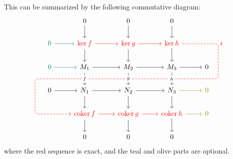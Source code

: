 \begin{theorem}
    This can be summarized by the following commutative diagram:
    \begin{equation*}
        \begin{tikzcd}
            & 0 \arrow{d} & 0 \arrow{d} & 0 \arrow{d} \\
            \textcolor{teal}{0} \arrow[color=teal]{r} & \textcolor{red}{\ker f} \arrow{d} \arrow[color=red]{r} &
            \textcolor{red}{\ker g} \arrow{d} \arrow[color=red]{r} \arrow[ddd, phantom, ""{coordinate, name=Z}] &
            \textcolor{red}{\ker h} \arrow{d}
            \arrow[rounded corners, dashrightarrow, color=red, to path={
                -- ([xshift=12ex]\tikztostart.east)
                |- (Z) [near end]\tikztonodes
                -| ([xshift=-12ex]\tikztotarget.west)
                -- (\tikztotarget)
            }]{dddll}[at start]{\delta} \\
            \textcolor{teal}{0} \arrow[color=teal]{r} &
            M_1 \arrow[crossing over, "f" description]{d} \arrow{r} &
            M_2 \arrow[crossing over, "g" description]{d} \arrow{r} &
            M_3 \arrow[crossing over, "h" description]{d} \arrow{r} & 0 \\
            0 \arrow{r} & N_1 \arrow{d} \arrow{r} &
            N_2 \arrow{d} \arrow{r} & N_3 \arrow{d} \arrow[color=olive]{r} &
            \textcolor{olive}{0} \\
            & \textcolor{red}{\coker f} \arrow{d} \arrow[color=red]{r} &
            \textcolor{red}{\coker g} \arrow{d} \arrow[color=red]{r} &
            \textcolor{red}{\coker h} \arrow{d} \arrow[color=olive]{r} &
            \textcolor{olive}{0} \\
            & 0 & 0 & 0
        \end{tikzcd}
    \end{equation*}
    where the red sequence is exact, and the teal and olive parts are optional.
\end{theorem}
